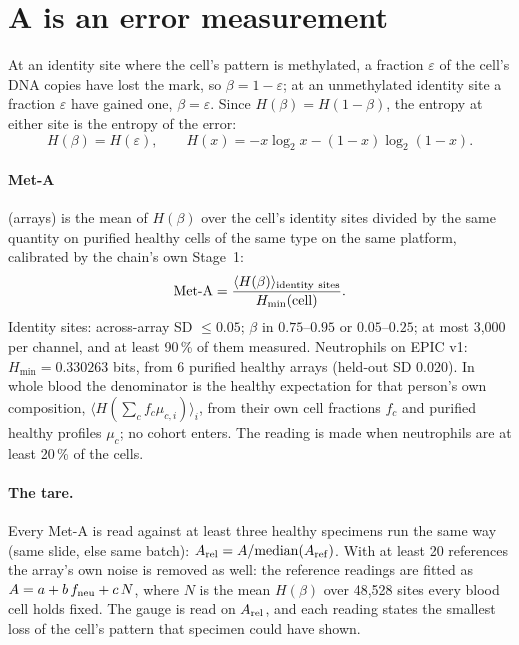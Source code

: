 \section{A is an error measurement}
At an identity site where the cell's pattern is methylated, a fraction $\varepsilon$ of the cell's DNA copies have lost the mark, so
$\beta=1-\varepsilon$; at an unmethylated identity site a fraction $\varepsilon$ have gained one, $\beta=\varepsilon$. Since
$H(\beta)=H(1-\beta)$, the entropy at either site is the entropy of the error:
\begin{equation}H(\beta)=H(\varepsilon),\qquad H(x)=-x\log_2x-(1-x)\log_2(1-x).\end{equation}
\paragraph{Met-A} (arrays) is the mean of $H(\beta)$ over the cell's identity sites divided by the same quantity on purified healthy cells of the
same type on the same platform, calibrated by the chain's own Stage~1:
\begin{equation}\text{Met-A}=\frac{\langle H(\beta)\rangle_{\rm identity\ sites}}{H_{\min}({\rm cell})}.\end{equation}
Identity sites: across-array SD $\le0.05$; $\beta$ in $0.75$--$0.95$ or $0.05$--$0.25$; at most 3,000 per channel, and at least 90\,\% of them
measured. Neutrophils on EPIC v1: $H_{\min}=0.330263$ bits, from 6 purified healthy arrays (held-out SD $0.020$). In whole blood the denominator is
the healthy expectation for that person's own composition, $\langle H(\sum_c f_c\mu_{c,i})\rangle_i$, from their own cell fractions $f_c$ and
purified healthy profiles $\mu_c$; no cohort enters. The reading is made when neutrophils are at least 20\,\% of the cells.
\paragraph{The tare.} Every Met-A is read against at least three healthy specimens run the same way (same slide, else same batch):
$A_{\rm rel}=A/\mathrm{median}(A_{\rm ref})$. With at least 20 references the array's own noise is removed as well: the reference readings are
fitted as $A=a+b\,f_{\rm neu}+c\,N$, where $N$ is the mean $H(\beta)$ over 48,528 sites every blood cell holds fixed. The gauge is read on
$A_{\rm rel}$, and each reading states the smallest loss of the cell's pattern that specimen could have shown.
